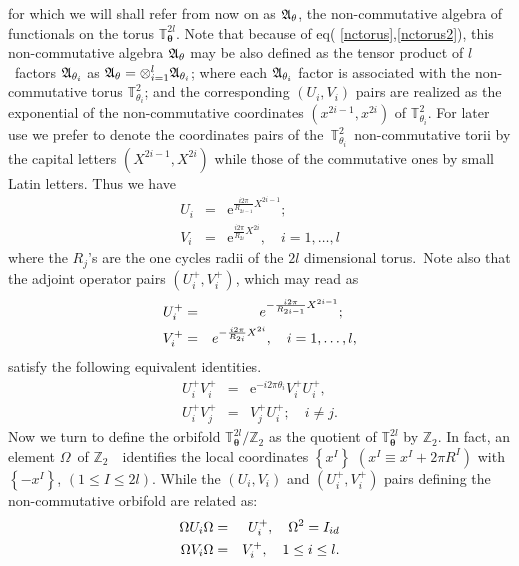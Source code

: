 \documentclass[a4paper,12pt]{article}
\begin{document}
for which we will shall refer from now on as $\frak{A}_{\theta }$, the non-commutative
algebra of functionals on the torus $\mathbb{T}_{\mathbf{\theta }}^{2l}$. Note that because of eq(%
\ref{nctorus},\ref{nctorus2}), this non-commutative algebra $\frak{A}_{\theta }$ may be also
defined as the tensor product of $l$\ factors $\frak{A}_{\theta _{i}}$ as $%
\frak{A}_{\theta }=\otimes _{i=1}^{l}\frak{A}_{\theta _{i}}$; where each $%
\frak{A}_{\theta _{i}}$ factor is associated with the non-commutative torus $%
\mathbb{T}_{\theta _{i}}^{2}$; and the corresponding $\left(
U_{i},V_{i}\right) $ pairs are realized as the exponential of the
non-commutative coordinates $\left( x^{2i-1},x^{2i}\right) $ of $\mathbb{T}%
_{\theta _{i}}^{2}$. For later use we prefer to denote the
coordinates pairs of the\ $\mathbb{T}_{\theta _{i}}^{2}$\
non-commutative torii by the capital letters $\left(
X^{2i-1},X^{2i}\right) $ while those of the commutative ones by
small Latin letters. Thus we have
\begin{eqnarray}
U_{i} &=&\text{e}^{\frac{i2\pi }{R_{2i-1}}X^{2i-1}};\quad  \label{2orbtorus}
\\
V_{i} &=&\text{e}^{\frac{i2\pi }{R_{2i}}X^{2i}},\quad i=1,\ldots ,l
\end{eqnarray}
where the $R_{j}$'s are the one cycles radii of the $2l$ dimensional torus.\
Note also that the adjoint operator pairs $\left( U_{i}^{+},V_{i}^{+}\right)
$, which may read as
\begin{eqnarray}
U_{i}^{+} &=&e^{-\frac{i2\pi }{R_{2i-1}}X^{2i-1}};\quad \\
V_{i}^{+} &=&e^{-\frac{i2\pi }{R_{2i}}X^{2i}},\quad i=1,\ldots ,l,  \notag
\end{eqnarray}
satisfy the following equivalent identities.
\begin{eqnarray}
U_{i}^{+}V_{i}^{+} &=&\text{e}^{-i2\pi \theta _{i}}V_{i}^{+}U_{i}^{+}, \\
U_{i}^{+}V_{j}^{+} &=&V_{j}^{+}U_{i}^{+};\quad i\neq j.
\end{eqnarray}
Now we turn to define the orbifold $\mathbb{T}_{\mathbf{\theta }}^{2l}/%
\mathbb{Z}_{2}$ as the quotient of $\mathbb{T}_{\mathbf{\theta }}^{2l}$ by $%
\mathbb{Z}_{2}$. In fact, an element $\Omega $\ of
$\mathbb{Z}_{2}$\ \ identifies the local coordinates $\left\{
x^{I}\right\} $ $\left( x^{I}\equiv x^{I}+2\pi R^{I}\right) $ with
$\left\{ -x^{I}\right\} $, $\left( 1\leq I\leq 2l\right) $. While
the $\left( U_{i},V_{i}\right) $ and $\left(
U_{i}^{+},V_{i}^{+}\right) $
pairs defining the non-commutative
orbifold are related as:
\begin{eqnarray}
\Omega U_{i}\Omega &=&U_{i}^{+},\quad \Omega ^{2}=I_{id}  \notag \\
\Omega V_{i}\Omega &=&V_{i}^{+},\quad 1\leq i\leq l.  \label{orbicons}
\end{eqnarray}
\end{document}
